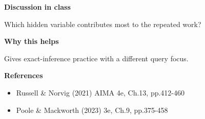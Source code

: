 \documentclass[11pt]{article}
\begin{document}
\begin{tcolorbox}[colback=white,colframe=MidnightBlue,title={Q3 Exact Inference Practice},fonttitle=\bfseries,breakable]
{\large\bfseries\color{MidnightBlue} Discussion in class}\par\medskip
Which hidden variable contributes most to the repeated work?

{\large\bfseries\color{MidnightBlue} Why this helps}\par\medskip
Gives exact-inference practice with a different query focus.

{\large\bfseries\color{MidnightBlue} References}\par\medskip
\begin{itemize}\item Russell \& Norvig (2021) AIMA 4e, Ch.13, pp.412-460
\item Poole \& Mackworth (2023) 3e, Ch.9, pp.375-458\end{itemize}
\end{tcolorbox}
\end{document}
